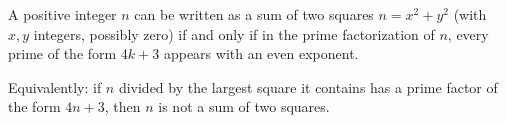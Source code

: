 A positive integer $n$ can be written as a sum of two squares $n = x^2 + y^2$ (with $x, y$ integers, possibly zero) if and only if in the prime factorization of $n$, every prime of the form $4k+3$ appears with an even exponent.

Equivalently: if $n$ divided by the largest square it contains has a prime factor of the form $4n+3$, then $n$ is not a sum of two squares.
